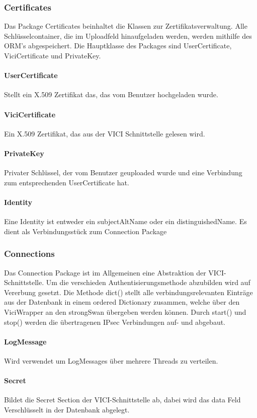 \subsubsection{Certificates}
Das Package Certificates beinhaltet die Klassen zur Zertifikatsverwaltung. Alle Schlüsselcontainer, die im Uploadfeld hinaufgeladen werden, werden mithilfe des ORM's abgespeichert. Die Hauptklasse des Packages sind UserCertificate, ViciCertificate und PrivateKey.


\par
\begingroup
\leftskip=1.0cm 
\noindent
\paragraph{UserCertificate} Stellt ein X.509 Zertifikat das, das vom Benutzer hochgeladen wurde.
\paragraph{ViciCertificate} Ein X.509 Zertifikat, das aus der VICI Schnittstelle gelesen wird.
\paragraph{PrivateKey} Privater Schlüssel, der vom Benutzer geuploaded wurde und eine Verbindung zum entsprechenden UserCertificate hat.

\paragraph{Identity} Eine Identity ist entweder ein subjectAltName oder ein distinguishedName. Es dient als Verbindungsstück zum Connection Package

\par
\endgroup



\subsubsection{Connections}
Das Connection Package ist im Allgemeinen eine Abstraktion der VICI-Schnittstelle. Um die verschieden Authentisierungsmethode abzubilden wird auf Vererbung gesetzt. Die Methode dict() stellt alle verbindungsrelevanten Einträge aus der Datenbank in einem ordered Dictionary zusammen, welche über den ViciWrapper an den strongSwan übergeben werden können. Durch start() und stop() werden die übertragenen IPsec Verbindungen auf- und abgebaut.

\par
\begingroup
\leftskip=1.0cm 
\noindent
\paragraph{LogMessage} Wird verwendet um LogMessages über mehrere Threads zu verteilen.

\paragraph{Secret} Bildet die Secret Section der VICI-Schnittstelle ab, dabei wird das data Feld Verschlüsselt in der Datenbank abgelegt. 

\par
\endgroup

\newpage